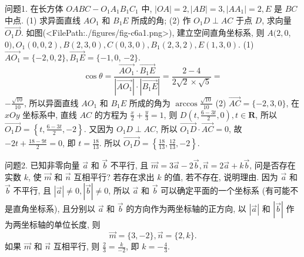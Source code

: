
问题1. 在长方体 $O A B C-O_1 A_1 B_1 C_1$ 中, $|O A|=2,|A B|=3,\left|A A_1\right|=2, E$
是 $B C$ 中点.
(1) 求异面直线 $A O_1$ 和 $B_1 E$ 所成的角;
(2) 作 $O_1 D \perp A C$ 于点 $D$, 求向量 $\overrightarrow{O_1 D}$.
如图(<FilePath:./figures/fig-c6a1.png>), 建立空间直角坐标系, 则 $A(2,0$, $0), O_1(0,0,2), B(2,3,0), C(0,3,0), B_1 (2,3,2), E(1,3,0)$.
(1) $\overrightarrow{A O_1}=\{-2,0,2\}, \overrightarrow{B_1 E}=\{-1,0$, $-2\}$.
$$
\cos \theta=\frac{\overrightarrow{A O_1} \cdot \overrightarrow{B_1 E}}{\left|\overrightarrow{A O_1}\right| \cdot\left|\overrightarrow{B_1 E}\right|}=\frac{2-4}{2 \sqrt{2} \times \sqrt{5}}=
$$
$-\frac{\sqrt{10}}{10}$, 所以异面直线 $A O_1$ 和 $B_1 E$ 所成的角为
$\arccos \frac{\sqrt{10}}{10}$
(2) $\overrightarrow{A C}=\{-2,3,0\}$, 在 $x O y$ 坐标系中, 直线 $A C$ 的方程为 $\frac{x}{2}+\frac{y}{3}=1$, 则 $D\left(t, \frac{6-3 t}{2}, 0\right), t \in \mathbf{R}$, 所以 $\overrightarrow{O_1 D}=\left\{t, \frac{6-3 t}{2},-2\right\}$.
又因为 $O_1 D \perp A C$, 所以 $\overrightarrow{O_1 D} \cdot \overrightarrow{A C}=0$, 故 $-2 t+\frac{18-9 t}{2}=0$, 即 $t=\frac{18}{13}$.
所以 $\overrightarrow{O_1 D}=\left\{\frac{18}{13}, \frac{12}{13},-2\right\}$.



问题2. 已知非零向量 $\vec{a}$ 和 $\vec{b}$ 不平行, 且 $\vec{m}=3 \vec{a}-2 \vec{b}, \vec{n}=2 \vec{a}+k \vec{b}$, 问是否存在实数 $k$, 使 $\vec{m}$ 和 $\vec{n}$ 互相平行? 若存在求出 $k$ 的值, 若不存在, 说明理由.
因为 $\vec{a}$ 和 $\vec{b}$ 不平行, 且 $|\vec{a}| \neq 0,|\vec{b}| \neq 0$, 所以 $\vec{a}$ 和 $\vec{b}$ 可以确定平面的一个坐标系 (有可能不是直角坐标系), 且分别以 $\vec{a}$ 和 $\vec{b}$ 的方向作为两坐标轴的正方向, 以 $|\vec{a}|$ 和 $|\vec{b}|$ 作为两坐标轴的单位长度, 则
$$
\vec{m}=\{3,-2\}, \vec{n}=\{2, k\} .
$$
如果 $\vec{m}$ 和 $\vec{n}$ 互相平行, 则 $\frac{2}{3}=\frac{k}{-2}$, 即 $k=-\frac{4}{3}$.



